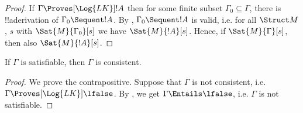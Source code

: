 \documentclass[../../../include/open-logic-section]{subfiles}
\begin{document}
\begin{proof}
If $\Gamma \Proves[\Log{LK}] !A$ then for some finite subset $\Gamma_0 
\subseteq \Gamma$, there is !!a{derivation} of $\Gamma_0 \Sequent !A$.  By 
, $\Gamma_0 \Sequent !A$ is valid, i.e. for all $
\Struct M$, $s$  with $\Sat{M}{\Gamma_0}[s]$ we have $\Sat{M}{!A}[s]$. Hence, 
if $\Sat{M}{\Gamma}[s]$, then also $\Sat{M}{!A}[s]$.
\end{proof}

\begin{cor}
If $\Gamma$ is satisfiable, then $\Gamma$ is consistent.
\end{cor}

\begin{proof}
We prove the contrapositive.  Suppose that $\Gamma$ is not consistent, i.e. $
 \Gamma \Proves[\Log{LK}] \lfalse$. By , we get $ 
\Gamma \Entails \lfalse$, i.e. $\Gamma$ is not satisfiable.
\end{proof}
\end{document}

